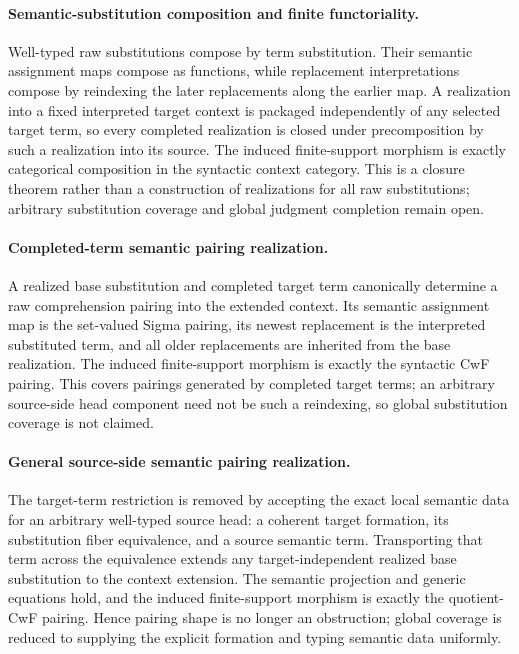\documentclass[11pt]{article}
\theoremstyle{definition}
\begin{document}
\paragraph{Semantic-substitution composition and finite functoriality.}
Well-typed raw substitutions compose by term substitution. Their semantic
assignment maps compose as functions, while replacement interpretations compose
by reindexing the later replacements along the earlier map. A realization into
a fixed interpreted target context is packaged independently of any selected
target term, so every completed realization is closed under precomposition by
such a realization into its source. The induced finite-support morphism is
exactly categorical composition in the syntactic context category. This is a
closure theorem rather than a construction of realizations for all raw
substitutions; arbitrary substitution coverage and global judgment completion
remain open.

\paragraph{Completed-term semantic pairing realization.}
A realized base substitution and completed target term canonically determine a
raw comprehension pairing into the extended context. Its semantic assignment
map is the set-valued Sigma pairing, its newest replacement is the interpreted
substituted term, and all older replacements are inherited from the base
realization. The induced finite-support morphism is exactly the syntactic CwF
pairing. This covers pairings generated by completed target terms; an arbitrary
source-side head component need not be such a reindexing, so global substitution
coverage is not claimed.

\paragraph{General source-side semantic pairing realization.}
The target-term restriction is removed by accepting the exact local semantic
data for an arbitrary well-typed source head: a coherent target formation, its
substitution fiber equivalence, and a source semantic term. Transporting that
term across the equivalence extends any target-independent realized base
substitution to the context extension. The semantic projection and generic
equations hold, and the induced finite-support morphism is exactly the
quotient-CwF pairing. Hence pairing shape is no longer an obstruction; global
coverage is reduced to supplying the explicit formation and typing semantic
data uniformly.
\end{document}
